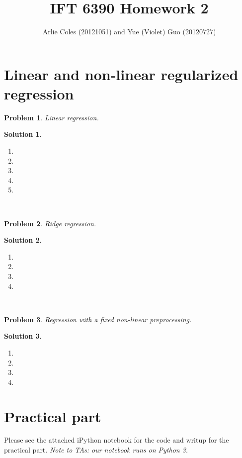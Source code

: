 \documentclass[letterpaper, 12pt]{article}
\newtheorem{problem}{Problem}
\theoremstyle{definition}
\newtheorem*{solution}{Solution}
\begin{document}
 

\def\lc{\left\lceil}   
\def\rc{\right\rceil}
\def\lf{\left\lfloor}
\def\rf{\right\rfloor}

 
\title{IFT 6390 Homework 2}
\author{Arlie Coles (20121051) and Yue (Violet) Guo (20120727)}
\maketitle

\section{Linear and non-linear regularized regression}

\begin{problem}
    Linear regression.
\end{problem}
\begin{solution}\
    \begin{enumerate}
        \item 
        \item
        \item
        \item
        \item
    \end{enumerate}
\end{solution}\

\begin{problem}
    Ridge regression.
\end{problem}
\begin{solution}\
    \begin{enumerate}
        \item 
        \item
        \item
        \item
    \end{enumerate}
\end{solution}\

\begin{problem}
    Regression with a fixed non-linear preprocessing.
\end{problem}
\begin{solution}\
    \begin{enumerate}
        \item 
        \item
        \item
        \item
    \end{enumerate}
\end{solution}

\section{Practical part}

Please see the attached iPython notebook for the code and writup for the practical part. \textit{Note to TAs: our notebook runs on Python 3.}
\end{document}

